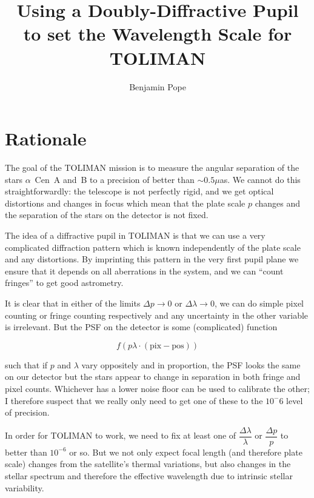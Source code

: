 \documentclass[a4paper,12pt]{article}
\def\name{Benjamin Pope}
\begin{document}
\title{Using a Doubly-Diffractive Pupil to set the Wavelength Scale for TOLIMAN
}
\author{Benjamin Pope}
\textwidth=19.0cm
\textheight=22.5cm
\abovedisplayskip=0pt
\belowdisplayskip=0pt
\maketitle

\section{Rationale}

The goal of the TOLIMAN mission is to measure the angular separation of the stars $\alpha$~Cen~A and~B to a precision of better than $\sim 0.5 \mu$as. We cannot do this straightforwardly: the telescope is not perfectly rigid, and we get optical distortions and changes in focus which mean that the plate scale $p$ changes and the separation of the stars on the detector is not fixed.

The idea of a diffractive pupil in TOLIMAN is that we can use a very complicated diffraction pattern which is known independently of the plate scale and any distortions. By imprinting this pattern in the very first pupil plane we ensure that it depends on all aberrations in the system, and we can ``count fringes'' to get good astrometry.

It is clear that in either of the limits $\Delta p \rightarrow 0$ or $\Delta \lambda \rightarrow 0$, we can do simple pixel counting or fringe counting respectively and any uncertainty in the other variable is irrelevant. But the PSF on the detector is some (complicated) function 

\begin{equation}
f(p\lambda\cdot(\text{pix}-\text{pos}))
\end{equation}

such that if $p$ and $\lambda$ vary oppositely and in proportion, the PSF looks the same on our detector but the stars appear to change in separation in both fringe and pixel counts. Whichever has a lower noise floor can be used to calibrate the other; I therefore suspect that we really only need to get one of these to the $10^-6$ level of precision.

In order for TOLIMAN to work, we need to fix at least one of $\dfrac{\Delta \lambda}{\lambda}$ or $\dfrac{\Delta p}{p}$ to better than $10^{-6}$ or so. But we not only expect focal length (and therefore plate scale) changes from the satellite's thermal variations, but also changes in the stellar spectrum and therefore the effective wavelength due to intrinsic stellar variability. 
\end{document}
